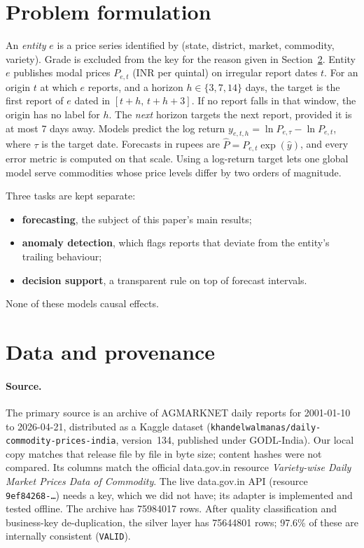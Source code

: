 \section{Problem formulation}\label{sec:problem}

An \emph{entity} $e$ is a price series identified by
(state, district, market, commodity, variety).
Grade is excluded from the key for the reason given in Section~\ref{sec:data}.
Entity $e$ publishes modal prices $P_{e,t}$ (INR per quintal) on irregular report dates $t$.
For an origin $t$ at which $e$ reports, and a horizon $h\in\{3,7,14\}$ days, the target is the first report of $e$ dated in $[t+h,\,t+h+3]$.
If no report falls in that window, the origin has no label for $h$.
The \emph{next} horizon targets the next report, provided it is at most 7 days away.
Models predict the log return $y_{e,t,h}=\ln P_{e,\tau}-\ln P_{e,t}$, where $\tau$ is the target date.
Forecasts in rupees are $\hat P=P_{e,t}\exp(\hat y)$, and every error metric is computed on that scale.
Using a log-return target lets one global model serve commodities whose price levels differ by two orders of magnitude.

Three tasks are kept separate:
\begin{itemize}
  \item \textbf{forecasting}, the subject of this paper's main results;
  \item \textbf{anomaly detection}, which flags reports that deviate from the entity's trailing behaviour;
  \item \textbf{decision support}, a transparent rule on top of forecast intervals.
\end{itemize}
None of these models causal effects.

\section{Data and provenance}\label{sec:data}

\paragraph{Source.}
The primary source is an archive of AGMARKNET daily reports for 2001-01-10 to 2026-04-21, distributed as a Kaggle dataset
(\texttt{khandelwalmanas/daily-commodity-prices-india}, version~134, published under GODL-India).
Our local copy matches that release file by file in byte size; content hashes were not compared.
Its columns match the official data.gov.in resource \emph{Variety-wise Daily Market Prices Data of Commodity}.
The live data.gov.in API (resource \texttt{9ef84268-\ldots}) needs a key, which we did not have; its adapter is implemented and tested offline.
The archive has \num{75984017} rows.
After quality classification and business-key de-duplication, the silver layer has \num{75644801} rows; 97.6\% of these are internally consistent (\texttt{VALID}).

